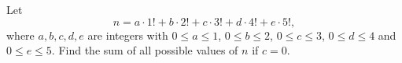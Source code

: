 Let
\[n=a\cdot1!+b\cdot2!+c\cdot3!+d\cdot4!+e\cdot5!,\]
where $a,b,c,d,e$ are integers with $0\le a\le1$, $0\le b\le2$, $0\le c\le3$, $0\le d\le4$ and $0\le e\le5$. Find the sum of all possible values of $n$ if $c=0$.
